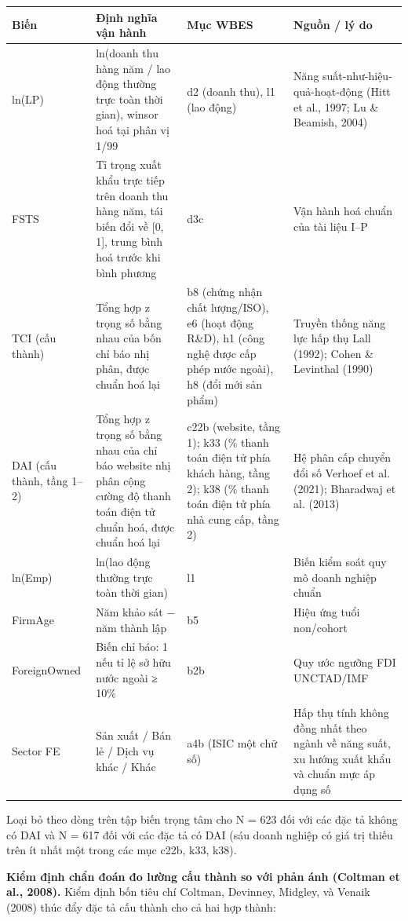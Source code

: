 \documentclass[12pt,a4paper]{article}
\begin{document}
\begin{longtable}[]{@{}llll@{}}
\toprule\noalign{}
Biến & Định nghĩa vận hành & Mục WBES & Nguồn / lý do \\
\midrule\noalign{}
\endhead
\bottomrule\noalign{}
\endlastfoot
ln(LP) & ln(doanh thu hàng năm / lao động thường trực toàn thời gian),
winsor hoá tại phân vị 1/99 & d2 (doanh thu), l1 (lao động) & Năng
suất-như-hiệu-quả-hoạt-động (Hitt et al., 1997; Lu \& Beamish, 2004) \\
FSTS & Tỉ trọng xuất khẩu trực tiếp trên doanh thu hàng năm, tái biến
đổi về {[}0, 1{]}, trung bình hoá trước khi bình phương & d3c & Vận hành
hoá chuẩn của tài liệu I--P \\
TCI (cấu thành) & Tổng hợp z trọng số bằng nhau của bốn chỉ báo nhị
phân, được chuẩn hoá lại & b8 (chứng nhận chất lượng/ISO), e6 (hoạt động
R\&D), h1 (công nghệ được cấp phép nước ngoài), h8 (đổi mới sản phẩm) &
Truyền thống năng lực hấp thụ Lall (1992); Cohen \& Levinthal (1990) \\
DAI (cấu thành, tầng 1--2) & Tổng hợp z trọng số bằng nhau của chỉ báo
website nhị phân cộng cường độ thanh toán điện tử chuẩn hoá, được chuẩn
hoá lại & c22b (website, tầng 1); k33 (\% thanh toán điện tử phía khách
hàng, tầng 2); k38 (\% thanh toán điện tử phía nhà cung cấp, tầng 2) &
Hệ phân cấp chuyển đổi số Verhoef et al. (2021); Bharadwaj et al.
(2013) \\
ln(Emp) & ln(lao động thường trực toàn thời gian) & l1 & Biến kiểm soát
quy mô doanh nghiệp chuẩn \\
FirmAge & Năm khảo sát − năm thành lập & b5 & Hiệu ứng tuổi
non/cohort \\
ForeignOwned & Biến chỉ báo: 1 nếu tỉ lệ sở hữu nước ngoài ≥ 10\% & b2b
& Quy ước ngưỡng FDI UNCTAD/IMF \\
Sector FE & Sản xuất / Bán lẻ / Dịch vụ khác / Khác & a4b (ISIC một chữ
số) & Hấp thụ tính không đồng nhất theo ngành về năng suất, xu hướng
xuất khẩu và chuẩn mực áp dụng số \\
\end{longtable}

Loại bỏ theo dòng trên tập biến trọng tâm cho N = 623 đối với các đặc tả
không có DAI và N = 617 đối với các đặc tả có DAI (sáu doanh nghiệp có
giá trị thiếu trên ít nhất một trong các mục c22b, k33, k38).

\textbf{Kiểm định chẩn đoán đo lường cấu thành so với phản ánh (Coltman
et al., 2008).} Kiểm định bốn tiêu chí Coltman, Devinney, Midgley, và
Venaik (2008) thúc đẩy đặc tả cấu thành cho cả hai hợp thành:
\end{document}
